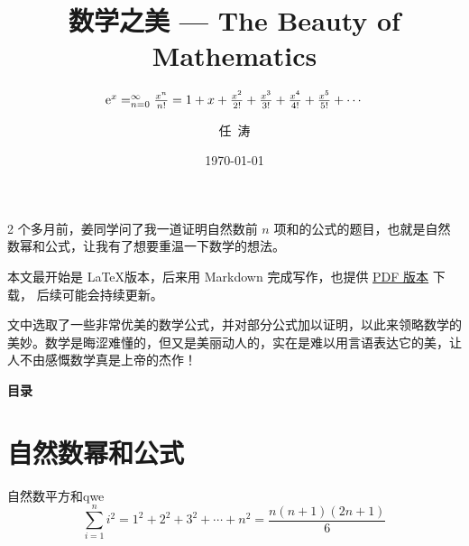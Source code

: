 \documentclass[12pt, cn]{elegantart}
\title{数学之美 --- The Beauty of Mathematics}
\subtitle{$\mathrm{e}^x=\relax_{n=0}^{\infty}\frac{x^n}{n!}=1+x+\frac{x^2}{2!}+\frac{x^3}{3!}+\frac{x^4}{4!}+\frac{x^5}{5!}+\cdots$}
\author{任\ 涛}
\date{\today}
\begin{document}
\maketitle

\begin{introduction}
\item 2 个多月前，姜同学问了我一道证明自然数前 $n$ 项和的公式的题目，也就是自然数幂和公式，让我有了想要重温一下数学的想法。
\item 本文最开始是 \LaTeX 版本，后来用 Markdown 完成写作，也提供 \href{https://tomben.me/the-beauty-of-mathematics/the-beauty-of-mathematics.pdf}{PDF 版本} 下载， 后续可能会持续更新。
\item 文中选取了一些非常优美的数学公式，并对部分公式加以证明，以此来领略数学的美妙。数学是晦涩难懂的，但又是美丽动人的，实在是难以用言语表达它的美，让人不由感慨数学真是上帝的杰作！
\end{introduction}

\begin{center}
	\Large\bfseries\color{structurecolor} 目\hspace{0.5em}录 \\[5pt]
\end{center}
\vspace{-0.8cm}
\tableofcontents
\clearpage

\section{自然数幂和公式}

\begin{theorem}{自然数平方和}{qwe}
\begin{equation}
   \sum_{i=1}^{n} i^{2}=1^2+2^2+3^2+\cdots+n^2=\frac{n(n+1)(2 n+1)}{6}
\end{equation}  
\end{theorem}
\end{document}
